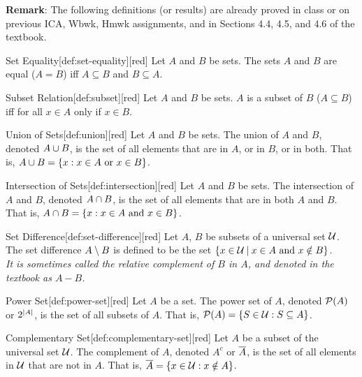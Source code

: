 \documentclass[10pt]{article}
\theoremstyle{definition}
\theoremstyle{plain}
\numberwithin{equation}{section}
\begin{document}
\textbf{Remark}: The following definitions (or results) are already proved in class or on previous ICA, 
Wbwk, Hmwk assignments, and in Sections 4.4, 4.5, and 4.6 of the textbook.
\begin{define}{Set Equality}[def:set-equality][red]
  Let $A$ and $B$ be sets. The sets $A$ and $B$ are equal ($A = B$) iff $A \subseteq B$ and $B \subseteq A$.
\end{define}
\begin{define}{Subset Relation}[def:subset][red]
  Let $A$ and $B$ be sets. $A$ is a subset of $B$ ($A \subseteq B$) iff for all $x \in A$ only if $x \in B$.
\end{define}  
\begin{define}{Union of Sets}[def:union][red]
  Let $A$ and $B$ be sets. The union of $A$ and $B$, denoted $A \sOR B$, is the 
  set of all elements that are in $A$, or in $B$, or in both. 
  That is, $A \sOR B = \{x : x \in A \text{ or } x \in B\}$.
\end{define}
\begin{define}{Intersection of Sets}[def:intersection][red]
  Let $A$ and $B$ be sets. The intersection of $A$ and $B$, denoted $A \sAND B$, is the 
  set of all elements that are in both $A$ and $B$. That is, $A \sAND B = \{x : x \in A \text{ and } x \in B\}$.
\end{define}
\begin{define}{Set Difference}[def:set-difference][red]
  Let $A$, $B$ be subsets of a universal set $\mathcal{U}$. The set difference $A \sMINUS B$ is defined to be the set $\{ x \in \setUNIV \LDIV x \in A \text{ and } x \notin B\}$. \vspace*{5px}\\
  \textit{It is sometimes called the relative complement of $B$ in $A$, and denoted in the textbook as $A - B$.}
\end{define}
\begin{define}{Power Set}[def:power-set][red]
  Let $A$ be a set. The power set of $A$, denoted $\sPOWER{A}$ or $2^{\left|A\right|}$, is the set of all subsets of $A$. That is, $\sPOWER{A} = \{S\in\setUNIV : S \subseteq A\}$.
\end{define}
\begin{define}{Complementary Set}[def:complementary-set][red]
  Let $A$ be a subset of the universal set $\mathcal{U}$. The complement of $A$, 
  denoted $A^c$ or $\sNOT{A}$, is the set of all elements in $\mathcal{U}$ that are not in $A$. 
  That is, $\sNOT{A} = \{x \in \setUNIV : x \notin A\}$.
\end{define}
\end{document}

